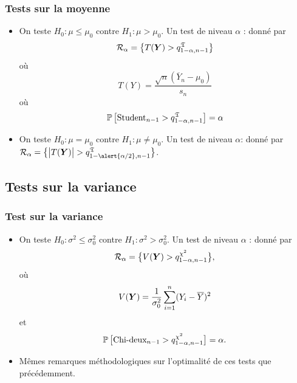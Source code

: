 \begin{frame}
\frametitle{Tests sur la moyenne}
\begin{itemize}
\item On teste \alert{$H_0 : \mu \leq \mu_0$ contre $H_1: \mu > \mu_0$}. Un test de niveau $\alpha$ : donné par
$${\mathcal R}_\alpha = \big\{T(\operatorname{\boldsymbol{Y}})>q_{1-\alpha, n-1}^{\mathfrak T}\big\}$$
où
$$T(Y)  = \frac{\sqrt{n}(\overline{Y}_n-\mu_0)}{s_n}$$
où
$$\operatorname{{\mathbb P}}\big[\text{Student}_{n-1} > q_{1-\alpha, n-1}^{\mathfrak{T}}\big]=\alpha$$
\item On teste \alert{ $H_0 : \mu = \mu_0$ contre $H_1:\mu \neq \mu_0$}. Un test de niveau $\alpha$: donné par
${\mathcal R}_\alpha = \big\{\big|T(\bY)\big| > q_{1-\alert{\alpha/2}, n-1}^{\mathfrak{T}}\big\}$.
\end{itemize}
\end{frame}
\subsection{Tests sur la variance}
\begin{frame}
\frametitle{Test sur la variance}
\begin{itemize}
\item On teste \alert{ $H_0:\sigma^2 \leq \sigma_0^2$ contre $H_1:\sigma^2 > \sigma_0^2$}. Un test de niveau $\alpha$ : donné par
$${\mathcal R}_\alpha = \big\{V(\operatorname{\boldsymbol{Y}})>q_{1-\alpha,n-1}^{\chi^2}\big\},$$
où
$$V(\operatorname{\boldsymbol{Y}}) = \frac{1}{\sigma_0^2}\sum_{i = 1}^n (Y_i - \overline{Y})^2$$
et
$$\operatorname{{\mathbb P}}\big[\text{Chi-deux}_{n-1} > q_{1-\alpha,n-1}^{\chi^2}\big] = \alpha.$$
\item \alert{Mêmes remarques méthodologiques} sur l'optimalité de ces tests que précédemment.
\end{itemize}
\end{frame}









